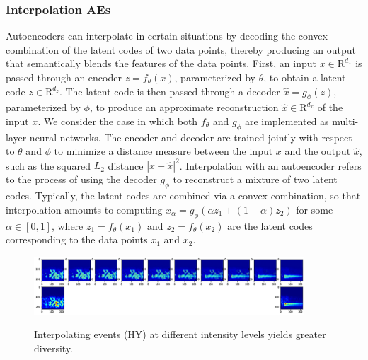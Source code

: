 \documentclass[journal]{IEEEtran}
\begin{document}
\subsubsection{Interpolation AEs}
Autoencoders can interpolate in certain situations by decoding the convex combination of the latent codes of two data points, thereby producing an output that semantically blends the features of the data points\cite{berthelot2018understanding}.
First, an input $x \in \mathrm{R}^{d_x}$ is passed through an encoder $z=f_\theta(x)$, parameterized by $\theta$, to obtain a latent code $z \in \mathrm{R}^{d_z}$. The latent code is then passed through a decoder $\hat{x}=g_\phi(z)$, parameterized by $\phi$, to produce an approximate reconstruction $\hat{x} \in \mathrm{R}^{d_x}$ of the input $x$. We consider the case in which both $f_\theta$ and $g_\phi$ are implemented as multi-layer neural networks. The encoder and decoder are trained jointly with respect to $\theta$ and $\phi$ to minimize a distance measure between the input $x$ and the output $\hat{x}$, such as the squared $L_2$ distance $\left|x-\hat{x}\right|^2$.
Interpolation with an autoencoder refers to the process of using the decoder $g_\phi$ to reconstruct a mixture of two latent codes. Typically, the latent codes are combined via a convex combination, so that interpolation amounts to computing $x_\alpha=g_\phi(\alpha z_1+(1-\alpha) z_2)$ for some $\alpha \in [0,1]$, where $z_1=f_\theta(x_1)$ and $z_2=f_\theta(x_2)$ are the latent codes corresponding to the data points $x_1$ and $x_2$.
\begin{figure}
\centering
{\includegraphics[width=0.9\textwidth,keepaspectratio]{img/da_interpolacion.png}}
\caption{Interpolating events (HY) at different intensity levels yields greater diversity.}
\label{fig:da_interpolation}
\end{figure}
\end{document}
